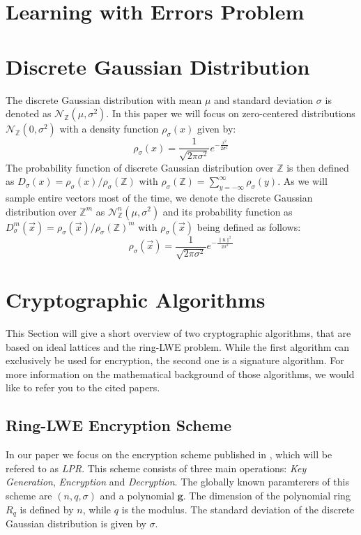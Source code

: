 \section{Learning with Errors Problem}

\section{Discrete Gaussian Distribution}
The discrete Gaussian distribution with mean \(\mu\) and standard deviation \(\sigma\) is denoted as \(\mathcal{N}_\mathbb{Z} (\mu, \sigma^2)\). In this paper we will focus on zero-centered distributions \(\mathcal{N}_\mathbb{Z} (0, \sigma^2)\) with a density function \(\rho_\sigma(x)\) given by:
\begin{equation}
	\rho_\sigma(x)=\frac{1}{\sqrt{2\pi \sigma^2}}e^{-\frac{x^2}{2\sigma^2}}
\end{equation}
The probability function of discrete Gaussian distribution over \(\mathbb{Z}\) is then defined as \(D_\sigma(x)=\rho_\sigma(x)/\rho_\sigma(\mathbb{Z})\) with \(\rho_\sigma(\mathbb{Z})=\sum_{y=-\infty}^{\infty} \rho_\sigma(y)\). As we will sample entire vectors most of the time, we denote the discrete Gaussian distribution over \(\mathbb{Z}^m\) as \(\mathcal{N}_\mathbb{Z}^{n} (\mu, \sigma^2)\) and its probability function as \(D_\sigma^m(\vec{x})=\rho_\sigma(\vec{x})/\rho_\sigma(\mathbb{Z})^m\) with \(\rho_\sigma(\vec{x})\) being defined as follows:
\begin{equation}
	\rho_\sigma(\vec{x})=\frac{1}{\sqrt{2\pi \sigma^2}}e^{-\frac{\|\textbf{x}\|^2}{2\sigma^2}}
\end{equation}

\section{Cryptographic Algorithms}
This Section will give a short overview of two cryptographic algorithms, that are based on ideal lattices and the ring-LWE problem. While the first algorithm can exclusively be used for encryption, the second one is a signature algorithm. For more information on the mathematical background of those algorithms, we would like to refer you to the cited papers.

\subsection{Ring-LWE Encryption Scheme}
In our paper we focus on the encryption scheme published in \cite{cryptoeprint:2012:230}, which will be refered to as \textit{LPR}. This scheme consists of three main operations: \textit{Key Generation}, \textit{Encryption} and \textit{Decryption}. The globally known paramterers of this scheme are \((n, q, \sigma)\) and a polynomial \(\textbf{g}\). The dimension of the polynomial ring \(R_q\) is defined by \(n\), while \(q\) is the modulus. The standard deviation of the discrete Gaussian distribution is given by \(\sigma\).

